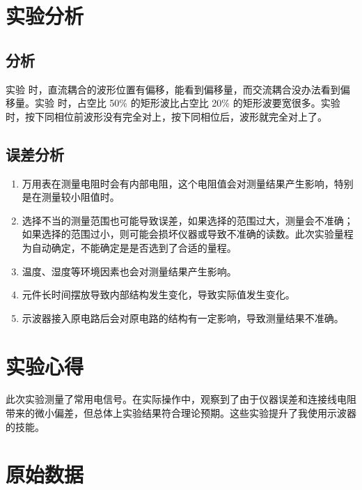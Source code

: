 \documentclass[a4paper,utf8]{article}
\begin{document}
\section{实验分析}

\subsection{分析}
实验 时，直流耦合的波形位置有偏移，能看到偏移量，而交流耦合没办法看到偏移量。实验 时，占空比 50\% 的矩形波比占空比 20\% 的矩形波要宽很多。实验 时，按下同相位前波形没有完全对上，按下同相位后，波形就完全对上了。
\subsection{误差分析}
    \begin{enumerate}
        \item 万用表在测量电阻时会有内部电阻，这个电阻值会对测量结果产生影响，特别是在测量较小阻值时。
        \item 选择不当的测量范围也可能导致误差，如果选择的范围过大，测量会不准确；如果选择的范围过小，则可能会损坏仪器或导致不准确的读数。此次实验量程为自动确定，不能确定是是否选到了合适的量程。
        \item 温度、湿度等环境因素也会对测量结果产生影响。
        \item 元件长时间摆放导致内部结构发生变化，导致实际值发生变化。
        \item 示波器接入原电路后会对原电路的结构有一定影响，导致测量结果不准确。
    \end{enumerate}
\section{实验心得}
此次实验测量了常用电信号。在实际操作中，观察到了由于仪器误差和连接线电阻带来的微小偏差，但总体上实验结果符合理论预期。这些实验提升了我使用示波器的技能。
\clearpage
\section{原始数据}
\begin{center}
\end{center}
\end{document}
